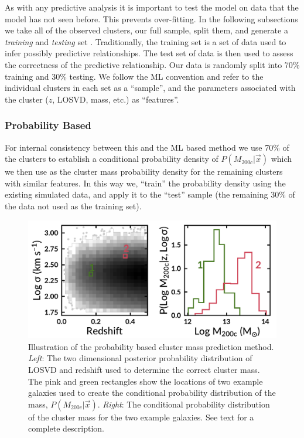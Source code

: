\documentclass[fleqn,usenatbib]{mnras}
\begin{document}
As with any predictive analysis it is important to test the model on data that the model has not seen before. This prevents over-fitting. In the following subsections we take all of the observed clusters, our full sample, split them, and generate a \emph{training} and \emph{testing} set . Traditionally, the training set is a set of data used to infer possibly predictive relationships. The test set of data is then used to assess the correctness of the predictive relationship. Our data is randomly split into 70\% training and 30\% testing. We follow the ML convention and refer to the individual clusters in each set as a ``sample'', and the parameters associated with the cluster ($z$, LOSVD, mass, etc.) as ``features''.

\subsubsection{Probability Based}\label{sec:probability method}
For internal consistency between this and the ML based method we use 70\% of the clusters to establish a conditional probability density of $P(M_{200c} | \vec{x})$ which we then use as the cluster mass probability density for the remaining clusters with similar features. In this way we, ``train'' the probability density using the existing simulated data, and apply it to the ``test'' sample (the remaining 30\% of the data not used as the training set).

\begin{figure}
		\includegraphics[width=\textwidth]{figures/prob_example.pdf} 
	\caption[Illustration of the probability based cluster mass prediction method.]{Illustration of the probability based cluster mass prediction method. \emph{Left}: The two dimensional posterior probability distribution of LOSVD and redshift used to determine the correct cluster mass. The pink and green rectangles show the locations of two example galaxies used to create the conditional probability distribution of the mass, $P(M_{200c}|\vec{x})$. \emph{Right}: The conditional probability distribution of the cluster mass for the two example galaxies. See text for a complete description.}
	\label{fig: probability corner} 
\end{figure}
\end{document}
